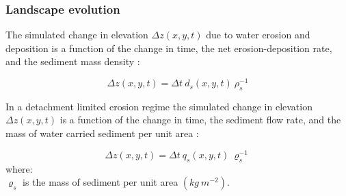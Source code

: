 \documentclass[esurf, manuscript]{copernicus}
\begin{document}


\subsubsection{Landscape evolution}
The simulated change in elevation $\Delta z(x,y,t)$ due to water erosion and deposition
is a function of
the change in time, the net erosion-deposition rate, and the sediment mass density 
\cite{Mitasova2013}:

\begin{equation}
\label{eq:evolution} 
{\Delta z(x,y,t) = \Delta t ~ d_s(x,y,t) ~ \rho_s^{-1} }
\end{equation}


In a detachment limited erosion regime
the simulated change in elevation $\Delta z(x,y,t)$
is a function of
the change in time, the sediment flow rate, and the mass of water carried sediment per unit area
\cite{Mitasova2013}:

\begin{equation}
\label{eq:flux_evolution} 
{\Delta z(x,y,t) = \Delta t ~ q_s(x,y,t) ~ \varrho_s^{-1} } 
\end{equation}
%
{\small
\noindent
where: \\
\noindent
\hspace*{0.5em} $\varrho_s$ is the mass of sediment per unit area $(kg ~ m^{-2})$.\\
}
\end{document}
